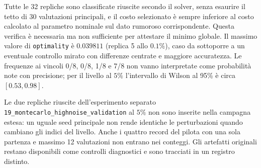 Tutte le 32 repliche sono classificate riuscite secondo il solver, senza esaurire il tetto di 30 valutazioni principali, e il costo selezionato è sempre inferiore al costo calcolato al parametro nominale sul dato rumoroso corrispondente. Questa verifica è necessaria ma non sufficiente per attestare il minimo globale. Il massimo valore di \texttt{optimality} è $0.039811$ (replica 5 allo $0.1\%$), caso da sottoporre a un eventuale controllo mirato con differenze centrate e maggiore accuratezza. Le frequenze ai vincoli 0/8, 0/8, 1/8 e 7/8 non vanno interpretate come probabilità note con precisione; per il livello al $5\%$ l'intervallo di Wilson al 95\% è circa $[0.53,0.98]$.

Le due repliche riuscite dell'esperimento separato \texttt{19\_montecarlo\_highnoise\_validation} al $5\%$ non sono inserite nella campagna estesa: un uguale seed principale non rende identiche le perturbazioni quando cambiano gli indici del livello. Anche i quattro record del pilota con una sola partenza e massimo 12 valutazioni non entrano nei conteggi. Gli artefatti originali restano disponibili come controlli diagnostici e sono tracciati in un registro distinto.
